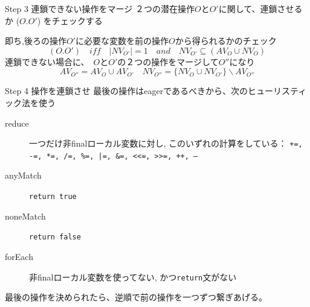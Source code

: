\begin{frame}{Step 3 連鎖できない操作をマージ}
２つの潜在操作$O$と$O'$に関して、連鎖させるか ($O.O'$) をチェックする

即ち,後ろの操作$O'$に必要な変数を前の操作$O$から得られるかのチェック
\begin{displaymath}
  (O.O') \quad \textit{iff} \quad |NV_{O'}|=1 \quad \textit{and} \quad NV_{O'} \subseteq (AV_O \cup NV_O)
\end{displaymath}
連鎖できない場合に、　$O$と$O'$の２つの操作をマージして$O''$になり
\[AV_{O''} = AV_O \cup AV_{O'} \quad NV_{O''}=\{NV_O \cup NV_{O'}\} \backslash AV_{O''}\]
\end{frame}
\begin{frame}{Step 4 操作を連鎖させ}
最後の操作はeagerであるべきから、次のヒューリスティック法を使う
\begin{description}
  \item[reduce] 一つだけ非finalローカル変数に対し, このいずれの計算をしている：
                \texttt{+=, -=, *=, /=, \%=, |=, \&=, <<=, >>=, ++, --}
  \item[anyMatch] \texttt{return true}
  \item[noneMatch] \texttt{return false}
  \item[forEach] 非finalローカル変数を使ってない, かつ\texttt{return}文がない
\end{description}
最後の操作を決められたら、逆順で前の操作を一つずつ繋ぎあげる。
\end{frame}

